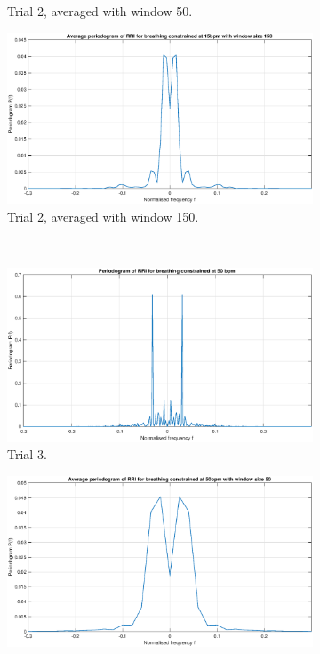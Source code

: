 \begin{figure}[H]
\begin{subfigure}{.32\textwidth}
  \caption{Trial 2, averaged with window 50.}
\end{subfigure}
\begin{subfigure}{.32\textwidth}
  \centering
  \includegraphics[width=\linewidth]{assignment3figs/new_pgm_con15_ave150.eps}  
  \caption{Trial 2, averaged with window 150.}
\end{subfigure}\\
\begin{subfigure}{.32\textwidth}
  \centering
  \includegraphics[width=\linewidth]{assignment3figs/new_pgmcon50_noave.eps}
  \caption{Trial 3.}
\end{subfigure}
\begin{subfigure}{.32\textwidth}
  \centering
  \includegraphics[width=\linewidth]{assignment3figs/new_pgm_con50_ave50.eps}  

\end{subfigure}
\end{figure}
